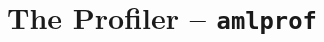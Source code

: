 
\chapter[The Profiler -- amlprof]{The Profiler -- \lstinline!amlprof!}
\label{sec:tools-amlprof}








